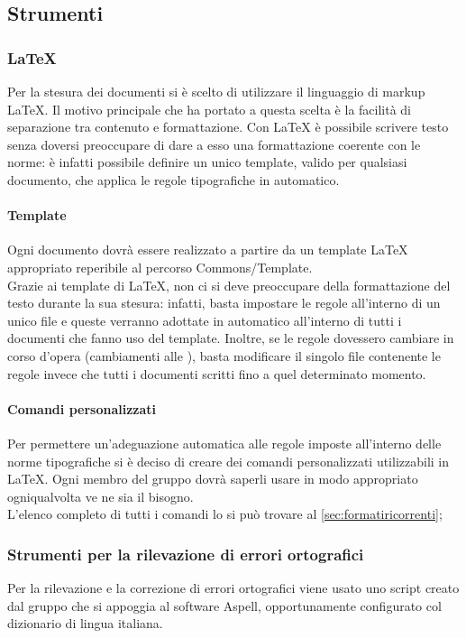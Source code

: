 	\subsection{Strumenti}
		\subsubsection{\LaTeX{}}
			Per la stesura dei documenti si è scelto di utilizzare il linguaggio di markup \LaTeX{}.  Il motivo principale che ha portato a questa scelta è la facilità di separazione tra contenuto e formattazione. Con \LaTeX{} è possibile scrivere testo senza doversi preoccupare di dare a esso una formattazione coerente con le norme: è infatti possibile definire un unico template, valido per qualsiasi documento, che applica le regole tipografiche in automatico.
			\paragraph{Template}
				Ogni documento dovrà essere realizzato a partire da un template \LaTeX{} appropriato reperibile al percorso Commons/Template.\\
				Grazie ai template di \LaTeX{}, non ci si deve preoccupare della formattazione del testo durante la sua stesura: infatti, basta impostare le regole all’interno di un unico file e queste verranno adottate in automatico all’interno di tutti i documenti che fanno uso del template. Inoltre, se le regole dovessero cambiare in corso d’opera (cambiamenti alle ), basta modificare il singolo file contenente le regole invece che tutti i documenti scritti fino a quel determinato momento.
			\paragraph{Comandi personalizzati}
				Per permettere un’adeguazione automatica alle regole imposte all’interno delle norme tipografiche si è deciso di creare dei comandi personalizzati utilizzabili in \LaTeX{}. Ogni membro del gruppo dovrà saperli usare in modo appropriato ogniqualvolta ve ne sia il bisogno.\\
				L’elenco completo di tutti i comandi lo si può trovare al \autoref{sec:formatiricorrenti};
		\subsubsection{Strumenti per la rilevazione di errori ortografici}
			Per la rilevazione e la correzione di errori ortografici viene usato uno script creato dal gruppo \groupname{} che si appoggia al software Aspell, opportunamente configurato col dizionario di lingua italiana.
